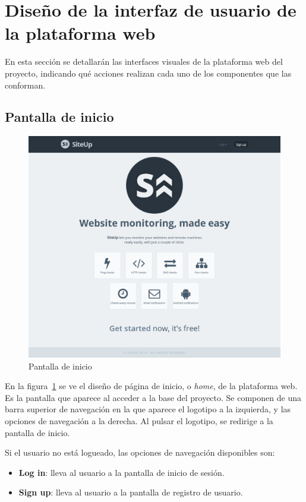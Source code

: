 \section{Diseño de la interfaz de usuario de la plataforma web}

En esta sección se detallarán las interfaces visuales de la plataforma web del
proyecto, indicando qué acciones realizan cada uno de los componentes que las
conforman.

\subsection{Pantalla de inicio}

\begin{figure}[htbp]
  \centering
  \includegraphics[width=\textwidth]{5_diseno/web-home.png}
  \caption{Pantalla de inicio}
  \label{fig:web-home}
\end{figure}

En la figura~\ref{fig:web-home} se ve el diseño de página de inicio, o
\textit{home}, de la plataforma web. Es la pantalla que aparece al acceder a la
base del proyecto. Se componen de una barra superior de navegación en la que
aparece el logotipo a la izquierda, y las opciones de navegación a la
derecha. Al pulsar el logotipo, se redirige a la pantalla de inicio.

Si el usuario no está logueado, las opciones de navegación disponibles son:

\begin{itemize}
\item \textbf{Log in}: lleva al usuario a la pantalla de inicio de sesión.
\item \textbf{Sign up}: lleva al usuario a la pantalla de registro de usuario.
\end{itemize}

